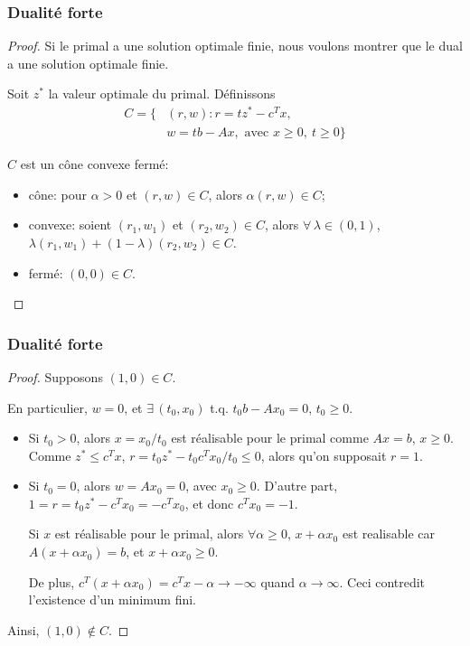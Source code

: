 \documentclass[usepdftitle=false]{beamer}
\begin{document}
\begin{frame}
\frametitle{Dualité forte}

\begin{proof}
Si le primal a une solution optimale finie, nous voulons montrer que le dual a une solution optimale finie.

\mbox{}

Soit $z^*$ la valeur optimale du primal. Définissons
\begin{align*}
C = \lbrace & (r, w): r = tz^* - c^Tx,\\
& w = tb-Ax, \mbox{ avec } x \geq 0,\ t \geq 0 \rbrace
\end{align*}

\mbox{}

$C$ est un cône convexe fermé:
\begin{itemize}
\item
cône: pour $\alpha > 0$ et $(r,w) \in C$, alors $\alpha(r,w) \in C$;
\item
convexe: soient $(r_1, w_1)$ et $(r_2, w_2) \in C$, alors $\forall\, \lambda \in (0,1)$, $\lambda(r_1, w_1) + (1 -\lambda) (r_2, w_2) \in C$.
\item
fermé: $(0,0) \in C$.
\end{itemize}

\end{proof}

\end{frame}

\begin{frame}
\frametitle{Dualité forte}

\begin{proof}

Supposons $(1,0) \in C$.

En particulier, $w = 0$, et $\exists\, (t_0, x_0)$ t.q. $t_0b - Ax_0 = 0$, $t_0 \geq 0$. %
\begin{itemize}
\item
Si $t_0 > 0$, alors
$x = x_0/t_0$ est réalisable pour le primal comme $Ax = b$, $x \geq 0$. %
Comme $z^* \leq c^Tx$, $r = t_0z^* - t_0c^Tx_0/t_0 \leq 0$, alors qu'on supposait $r = 1$.
\item
Si $t_0 = 0$, alors $w = Ax_0 = 0$, avec $x_0 \geq 0$.
D'autre part, $1 = r = t_0z^* - c^Tx_0 = -c^Tx_0$, et donc $c^T x_0 = -1$.

Si $x$ est réalisable pour le primal, alors $\forall \alpha \geq 0$, $x+\alpha x_0$ est realisable car $A(x+\alpha x_0) = %
b$, et $x+\alpha x_0 \geq 0$.

De plus, $c^T(x+\alpha x_0) = c^Tx - \alpha \rightarrow -\infty$ quand $\alpha \rightarrow \infty$.
Ceci contredit l'existence d'un minimum fini.
\end{itemize}
Ainsi, $(1,0) \notin C$.

\end{proof}

\end{frame}
\end{document}
